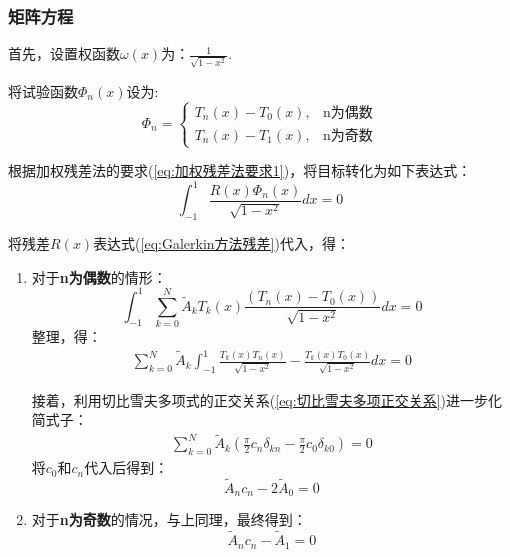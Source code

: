 \documentclass[12pt]{ctexart}
\numberwithin{equation}{section} %
\begin{document}
\subsubsection{矩阵方程}
首先，设置权函数$\omega(x)$为：$\frac{1}{\sqrt{1-x^2}}$.

    将试验函数$\Phi_n(x)$设为:
    \begin{equation}
        \Phi_n=\begin{cases}T_n(x)-T_0(x),&\text{n为偶数}\\T_n(x)-T_1(x),&\text{n为奇数}\end{cases}
        \label{eq:Galerkin方法试验函数}
        \end{equation}


根据加权残差法的要求(\ref{eq:加权残差法要求1})，将目标转化为如下表达式：
\begin{equation}
    \boxed{\int_{-1}^1\frac{R(x)\Phi_n(x)}{\sqrt{1-x^2}}dx=0}
    \label{eq:Galerkin方法加权残差表达式}
\end{equation}

将残差$R(x)$​表达式(\ref{eq:Galerkin方法残差})代入，得：

\begin{enumerate}
    \item 对于\textbf{n为偶数}的情形：
    \begin{equation}
        \int_{-1}^1\sum_{k=0}^N\tilde{A}_kT_k(x)\frac{(T_n(x)-T_0(x))}{\sqrt{1-x^2}}dx=0
    \end{equation}
    整理，得：
    \begin{equation}
        \begin{aligned}\sum_{k=0}^N\tilde{A}_k\int_{-1}^1\frac{T_k(x)T_n(x)}{\sqrt{1-x^2}}-\frac{T_k(x)T_0(x)}{\sqrt{1-x^2}}dx=0\end{aligned}
    \end{equation}

    接着，利用切比雪夫多项式的正交关系(\ref{eq:切比雪夫多项正交关系})进一步化简式子：
    \begin{equation}
        \begin{aligned}\sum_{k=0}^N\tilde{A}_k(\frac{\pi}{2}c_n\delta_{kn}-\frac{\pi}{2}c_0\delta_{k0})=0\end{aligned}
    \end{equation}
    将$c_0$和$c_n$代入后得到：$$\tilde{A}_nc_n-2\tilde{A}_0=0$$
    \item 对于\textbf{n为奇数}的情况，与上同理，最终得到：
    \begin{equation}
        \tilde{A}_nc_n-\tilde{A}_1=0
    \end{equation}
\end{enumerate}
\end{document}
